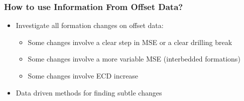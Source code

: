 \documentclass{beamer}
\begin{document}
\begin{frame}
\begin{columns}[onlytextwidth]
\begin{column}{0.4\textwidth}


\end{column}
\end{columns}

\end{frame}


\begin{frame} \frametitle{How to use Information From Offset Data?} 
\vspace{-1cm}

\begin{itemize}
\item<1-> Investigate all formation changes on offset data:
\begin{itemize}
\item<2-> Some changes involve a clear step in MSE or a clear drilling break
\item<3-> Some changes involve a more variable MSE (interbedded formations)
\item<4-> Some changes involve ECD increase 
\end{itemize}
\item<5-> Data driven methods for finding subtle changes
\end{itemize}
\end{frame}
\end{document}
